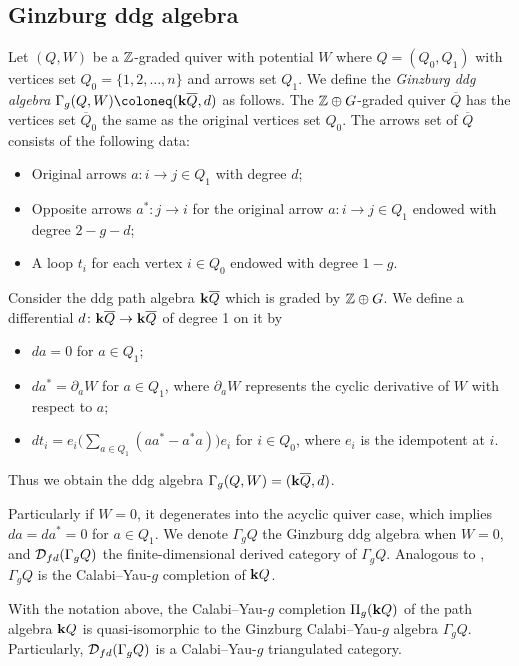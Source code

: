 \subsection{Ginzburg ddg algebra}
\begin{definition}
  Let $(Q, W)$ be a $\mathbb{Z}$-graded quiver with potential $W$
  where $Q = (Q_0,Q_1)$ with vertices set $Q_0 = \{1, 2, \ldots, n\}$
  and arrows set $Q_1$.
  We define the \textit{Ginzburg ddg algebra}
  $\Gamma_g(Q, W) \coloneq (\Bk \overline{Q}, d)$ as follows.
  The $\mathbb{Z} \oplus G$-graded quiver $\overline{Q}$ has the vertices set
  $\overline{Q}_0$ the same as the original vertices set $Q_0$.
  The arrows set of $\overline{Q}$ consists of the following data:
  \begin{itemize}
    \item Original arrows $a \colon i \to j \in Q_1$ with degree $d$;
    \item Opposite arrows $a^* \colon j \to i$ for the original arrow
      $a \colon i \to j \in Q_1$ endowed with degree $2 - g - d$;
    \item A loop $t_i$ for each vertex $i \in Q_0$ endowed with degree $1 - g$.
  \end{itemize}
  Consider the ddg path algebra $\mathbf{k} \overline{Q}$ which is graded by $\mathbb{Z} \oplus G$.
  We define a differential $d \colon \mathbf{k} \overline{Q} \to \mathbf{k} \overline{Q}$
  of degree 1 on it by
  \begin{itemize}
    \item $da = 0$ for $a \in Q_1$;
    \item $da^* = \partial_aW$ for $a \in Q_1$, where $\partial_aW$
      represents the cyclic derivative of $W$ with respect to $a$;
    \item $dt_i = e_i\bigl(\sum_{a \in Q_1}(aa^* - a^*a)\bigr) e_i$
      for $i \in Q_0$, where $e_i$ is the idempotent at $i$.
  \end{itemize}
  Thus we obtain the ddg algebra $\Gamma_g(Q,W) = (\mathbf{k} \overline{Q}, d)$.
\end{definition}
Particularly if $W = 0$, it degenerates into the acyclic quiver case,
which implies $da = da^* = 0$ for $a \in Q_1$.
We denote $\Gamma_gQ$ the Ginzburg ddg algebra when $W = 0$,
and $\operatorname{\mathcal{D}}_{fd}(\Gamma_gQ)$ the finite-dimensional derived category of $\Gamma_gQ$.
Analogous to \cite[Corollary 2.8]{Q12},
$\Gamma_gQ$ is the Calabi--Yau-$g$ completion of $\mathbf{k} Q$.

\begin{theorem}\cite{Q12}\label{3.10}
  With the notation above,
  the Calabi--Yau-$g$ completion $\Pi_g(\mathbf{k} Q)$ of the path algebra $\mathbf{k} Q$
  is quasi-isomorphic to the Ginzburg Calabi--Yau-$g$ algebra $\Gamma_gQ$.
  Particularly, $\operatorname{\mathcal{D}}_{fd}(\Gamma_gQ)$ is a Calabi--Yau-$g$ triangulated category.
\end{theorem}
